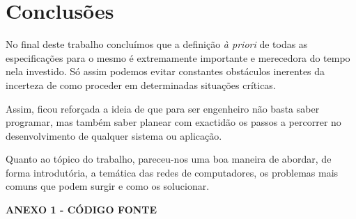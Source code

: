 \documentclass[a4paper,11pt]{article}
\begin{document}
\section{Conclusões}

No final deste trabalho concluímos que a definição \textit{à priori} de todas as especificações para o mesmo é extremamente importante e merecedora do tempo nela investido. Só assim podemos evitar constantes obstáculos inerentes da incerteza de como proceder em determinadas situações críticas.

Assim, ficou reforçada a ideia de que para ser engenheiro não basta saber programar, mas também saber planear com exactidão os passos a percorrer no desenvolvimento de qualquer sistema ou aplicação.

Quanto ao tópico do trabalho, pareceu-nos uma boa maneira de abordar, de forma introdutória, a temática das redes de computadores, os problemas mais comuns que podem surgir e como os solucionar.

\newpage

\vspace*{\fill} 
\centering
\begin{Huge}\textbf{ANEXO 1 - CÓDIGO FONTE}\end{Huge}
\vspace*{\fill}
\thispagestyle{empty}
\setcounter{page}{1}
\end{document}
